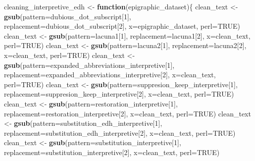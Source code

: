 \documentclass[]{article}
\newenvironment{Shaded}{\begin{snugshade}}{\end{snugshade}}
\newcommand{\ControlFlowTok}[1]{\textcolor[rgb]{0.13,0.29,0.53}{\textbf{#1}}}
\newcommand{\DataTypeTok}[1]{\textcolor[rgb]{0.13,0.29,0.53}{#1}}
\newcommand{\DecValTok}[1]{\textcolor[rgb]{0.00,0.00,0.81}{#1}}
\newcommand{\KeywordTok}[1]{\textcolor[rgb]{0.13,0.29,0.53}{\textbf{#1}}}
\newcommand{\NormalTok}[1]{#1}
\newcommand{\OtherTok}[1]{\textcolor[rgb]{0.56,0.35,0.01}{#1}}
\newcommand{\StringTok}[1]{\textcolor[rgb]{0.31,0.60,0.02}{#1}}
\begin{document}
\begin{Shaded}
\begin{Highlighting}[]
\NormalTok{cleaning_interpretive_edh <-}\StringTok{ }\ControlFlowTok{function}\NormalTok{(epigraphic_dataset)\{}
\NormalTok{   clean_text <-}\StringTok{ }\KeywordTok{gsub}\NormalTok{(}\DataTypeTok{pattern=}\NormalTok{dubious_dot_subscript[}\DecValTok{1}\NormalTok{], }\DataTypeTok{replacement=}\NormalTok{dubious_dot_subscript[}\DecValTok{2}\NormalTok{], }\DataTypeTok{x=}\NormalTok{epigraphic_dataset, }\DataTypeTok{perl=}\OtherTok{TRUE}\NormalTok{)}
\NormalTok{   clean_text <-}\StringTok{ }\KeywordTok{gsub}\NormalTok{(}\DataTypeTok{pattern=}\NormalTok{lacuna1[}\DecValTok{1}\NormalTok{], }\DataTypeTok{replacement=}\NormalTok{lacuna1[}\DecValTok{2}\NormalTok{], }\DataTypeTok{x=}\NormalTok{clean_text, }\DataTypeTok{perl=}\OtherTok{TRUE}\NormalTok{)}
\NormalTok{   clean_text <-}\StringTok{ }\KeywordTok{gsub}\NormalTok{(}\DataTypeTok{pattern=}\NormalTok{lacuna2[}\DecValTok{1}\NormalTok{], }\DataTypeTok{replacement=}\NormalTok{lacuna2[}\DecValTok{2}\NormalTok{], }\DataTypeTok{x=}\NormalTok{clean_text, }\DataTypeTok{perl=}\OtherTok{TRUE}\NormalTok{)}
\NormalTok{   clean_text <-}\StringTok{ }\KeywordTok{gsub}\NormalTok{(}\DataTypeTok{pattern=}\NormalTok{expanded_abbreviations_interpretive[}\DecValTok{1}\NormalTok{], }\DataTypeTok{replacement=}\NormalTok{expanded_abbreviations_interpretive[}\DecValTok{2}\NormalTok{], }\DataTypeTok{x=}\NormalTok{clean_text, }\DataTypeTok{perl=}\OtherTok{TRUE}\NormalTok{)}
\NormalTok{   clean_text <-}\StringTok{ }\KeywordTok{gsub}\NormalTok{(}\DataTypeTok{pattern=}\NormalTok{suppresion_keep_interpretive[}\DecValTok{1}\NormalTok{], }\DataTypeTok{replacement=}\NormalTok{suppresion_keep_interpretive[}\DecValTok{2}\NormalTok{], }\DataTypeTok{x=}\NormalTok{clean_text, }\DataTypeTok{perl=}\OtherTok{TRUE}\NormalTok{)}
\NormalTok{   clean_text <-}\StringTok{ }\KeywordTok{gsub}\NormalTok{(}\DataTypeTok{pattern=}\NormalTok{restoration_interpretive[}\DecValTok{1}\NormalTok{], }\DataTypeTok{replacement=}\NormalTok{restoration_interpretive[}\DecValTok{2}\NormalTok{], }\DataTypeTok{x=}\NormalTok{clean_text, }\DataTypeTok{perl=}\OtherTok{TRUE}\NormalTok{)}
\NormalTok{   clean_text <-}\StringTok{ }\KeywordTok{gsub}\NormalTok{(}\DataTypeTok{pattern=}\NormalTok{substitution_edh_interpretive[}\DecValTok{1}\NormalTok{], }\DataTypeTok{replacement=}\NormalTok{substitution_edh_interpretive[}\DecValTok{2}\NormalTok{], }\DataTypeTok{x=}\NormalTok{clean_text, }\DataTypeTok{perl=}\OtherTok{TRUE}\NormalTok{)}
\NormalTok{   clean_text <-}\StringTok{ }\KeywordTok{gsub}\NormalTok{(}\DataTypeTok{pattern=}\NormalTok{substitution_interpretive[}\DecValTok{1}\NormalTok{], }\DataTypeTok{replacement=}\NormalTok{substitution_interpretive[}\DecValTok{2}\NormalTok{], }\DataTypeTok{x=}\NormalTok{clean_text, }\DataTypeTok{perl=}\OtherTok{TRUE}\NormalTok{)}

\end{Highlighting}
\end{Shaded}
\end{document}
